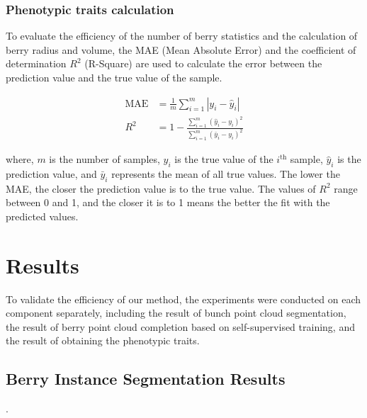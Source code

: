 \documentclass[12pt]{article}
\begin{document}
\subsubsection{Phenotypic traits calculation}
\label{sec:253}
To evaluate the efficiency of the number of berry statistics and the calculation of berry radius and volume, the MAE (Mean Absolute Error) and the coefficient of determination $R^2$ (R-Square) are used to calculate the error between the prediction value and the true value of the sample.

\begin{align}
    \text{MAE} &= \frac{1}{m} \sum_{i=1}^{m} |y_i - \hat{y}_i| \tag{12}\\
    R^2 &= 1 - \frac{\sum_{i=1}^{m} (\hat{y}_i - y_i)^2}{\sum_{i=1}^{m} (\bar{y}_i - y_i)^2} \tag{13}
\end{align}

{\raggedright where, $m$ is the number of samples, $y_i$ is the true value of the $i^{\text{th}}$ sample, $\hat{y}_i$ is the prediction value, and $\bar{y}_i$ represents the mean of all true values. 
The lower the MAE, the closer the prediction value is to the true value. The values of $R^2$ range between 0 and 1, and the closer it is to 1 means the better the fit with the predicted values.}

\section{Results}

To validate the efficiency of our method, the experiments were conducted on each component separately, including the result of bunch point cloud segmentation, the result of berry point cloud completion based on self-supervised training, and the result of obtaining the phenotypic traits.

\subsection{Berry Instance Segmentation Results}
\label{sec:insegresults}

. 
\end{document}
